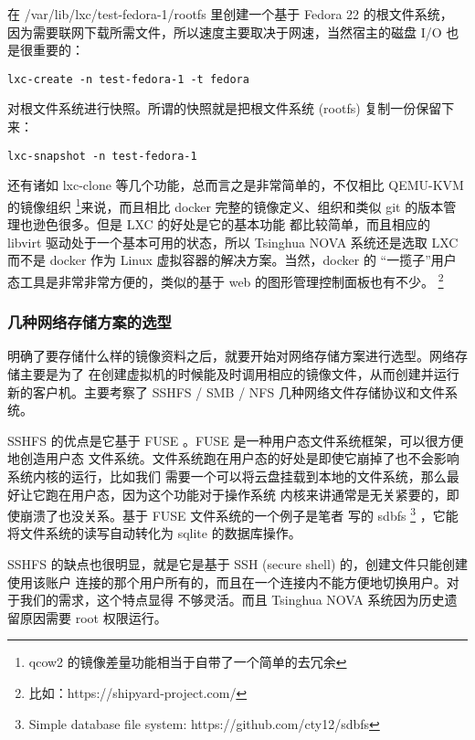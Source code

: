 在 /var/lib/lxc/test-fedora-1/rootfs 里创建一个基于 Fedora 22 的根文件系统，
因为需要联网下载所需文件，所以速度主要取决于网速，当然宿主的磁盘 I/O 也是很重要的：

\begin{lstlisting}
lxc-create -n test-fedora-1 -t fedora
\end{lstlisting}

对根文件系统进行快照。所谓的快照就是把根文件系统 (rootfs) 复制一份保留下来：

\begin{lstlisting}
lxc-snapshot -n test-fedora-1
\end{lstlisting}

还有诸如 lxc-clone 等几个功能，总而言之是非常简单的，不仅相比 QEMU-KVM 的镜像组织
\footnote{qcow2 的镜像差量功能相当于自带了一个简单的去冗余}来说，而且相比 docker
完整的镜像定义、组织和类似 git 的版本管理也逊色很多。但是 LXC 的好处是它的基本功能
都比较简单，而且相应的 libvirt 驱动处于一个基本可用的状态，所以 Tsinghua NOVA
系统还是选取 LXC 而不是 docker 作为 Linux 虚拟容器的解决方案。当然，docker 的
“一揽子”用户态工具是非常非常方便的，类似的基于 web 的图形管理控制面板也有不少。
\footnote{比如：https://shipyard-project.com/}

\subsubsection{几种网络存储方案的选型}
\label{subsubsec:network-storage}

明确了要存储什么样的镜像资料之后，就要开始对网络存储方案进行选型。网络存储主要是为了
在创建虚拟机的时候能及时调用相应的镜像文件，从而创建并运行新的客户机。主要考察了
SSHFS / SMB / NFS 几种网络文件存储协议和文件系统。

SSHFS 的优点是它基于 FUSE 。FUSE 是一种用户态文件系统框架，可以很方便地创造用户态
文件系统。文件系统跑在用户态的好处是即使它崩掉了也不会影响系统内核的运行，比如我们
需要一个可以将云盘挂载到本地的文件系统，那么最好让它跑在用户态，因为这个功能对于操作系统
内核来讲通常是无关紧要的，即使崩溃了也没关系。基于 FUSE 文件系统的一个例子是笔者
写的 sdbfs \footnote{Simple database file system:
https://github.com/cty12/sdbfs} ，它能将文件系统的读写自动转化为 sqlite 的数据库操作。

SSHFS 的缺点也很明显，就是它是基于 SSH (secure shell) 的，创建文件只能创建使用该账户
连接的那个用户所有的，而且在一个连接内不能方便地切换用户。对于我们的需求，这个特点显得
不够灵活。而且 Tsinghua NOVA 系统因为历史遗留原因需要 root 权限运行。

